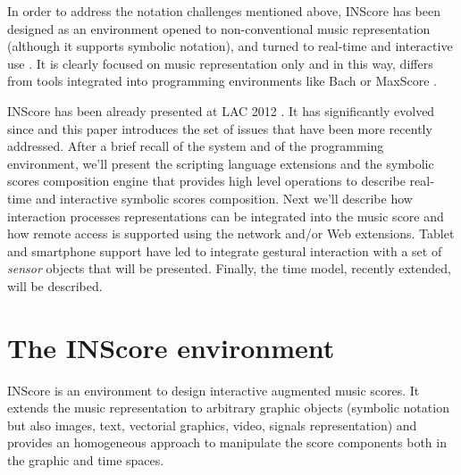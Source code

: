 \documentclass[11pt,a4paper]{article}
\begin{document}
In order to address the notation challenges mentioned above, INScore \cite{Fober:10c} has been designed as an environment opened to non-conventional music representation (although it supports symbolic notation), and turned to real-time and interactive use \cite{Fober:13b}. It is clearly focused on music representation only and in this way, differs from tools integrated into programming environments like Bach \cite{agostini12b} or MaxScore \cite{didko08}. 

INScore has been already presented at LAC 2012 \cite{Fober:12a}. It has significantly evolved since and this paper introduces the set of issues that have been more recently addressed. After a brief recall of the system and of the programming environment, we'll present the scripting language extensions and the symbolic scores composition engine that provides high level operations to describe real-time and interactive symbolic scores composition. Next we'll describe how interaction processes representations can be integrated into the music score and how remote access is supported using the network and/or Web extensions. Tablet and smartphone support have led to integrate gestural interaction with a set of \emph{sensor} objects that will be presented. Finally, the time model, recently extended, will be described.


\section{The INScore environment}
INScore is an environment to design interactive augmented music scores. It extends the music representation to arbitrary graphic objects (symbolic notation but also images, text, vectorial graphics, video, signals representation) and provides an homogeneous approach to manipulate the score components both in the graphic and time spaces. 
\end{document}

